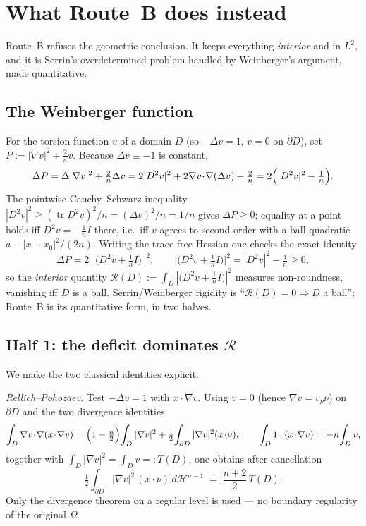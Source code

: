 \documentclass[11pt]{amsart}
\theoremstyle{definition}
\theoremstyle{remark}
\newcommand{\Om}{\Omega}
\newcommand{\R}{\mathcal R}
\newcommand{\Hn}{\mathcal H^{n-1}}
\newcommand{\TF}{\bigl(D^2v+\tfrac1n I\bigr)}
\DeclareMathOperator{\tr}{tr}
\begin{document}
\section{What Route~B does instead}

Route~B refuses the geometric conclusion. It keeps everything
\emph{interior} and in $L^2$, and it is Serrin's overdetermined problem
handled by Weinberger's argument, made quantitative.

\subsection{The Weinberger function}
For the torsion function $v$ of a domain $D$ (so $-\Delta v=1$, $v=0$
on $\partial D$), set $P:=|\nabla v|^2+\tfrac2n v$. Because
$\Delta v\equiv-1$ is constant,
\[
  \Delta P=\Delta|\nabla v|^2+\tfrac2n\Delta v
  =2|D^2v|^2+2\nabla v\!\cdot\!\nabla(\Delta v)-\tfrac2n
  =2\Bigl(|D^2v|^2-\tfrac1n\Bigr).
\]
The pointwise Cauchy--Schwarz inequality
$|D^2v|^2\ge(\tr D^2v)^2/n=(\Delta v)^2/n=1/n$ gives $\Delta P\ge0$;
equality at a point holds iff $D^2v=-\tfrac1n I$ there, i.e.\ iff $v$
agrees to second order with a ball quadratic $a-|x-x_0|^2/(2n)$.
Writing the trace-free Hessian one checks the exact identity
\begin{equation}\label{eq:DP}
  \Delta P=2\,\bigl|\,\TF\,\bigr|^2,\qquad
  \bigl|\TF\bigr|^2=|D^2v|^2-\tfrac1n\ge0,
\end{equation}
so the \emph{interior} quantity
$\R(D):=\int_D|\TF|^2$ measures non-roundness, vanishing iff $D$ is a
ball. Serrin/Weinberger rigidity is ``$\R(D)=0\Rightarrow D$ a ball'';
Route~B is its quantitative form, in two halves.

\subsection{Half 1: the deficit dominates $\R$}
We make the two classical identities explicit.

\emph{Rellich--Pohozaev.} Test $-\Delta v=1$ with $x\!\cdot\!\nabla v$.
Using $v=0$ (hence $\nabla v=v_\nu\nu$) on $\partial D$ and the two
divergence identities
\[
  \int_D\nabla v\!\cdot\!\nabla(x\!\cdot\!\nabla v)
  =\Bigl(1-\tfrac n2\Bigr)\!\int_D|\nabla v|^2
   +\tfrac12\!\int_{\partial D}|\nabla v|^2(x\!\cdot\!\nu),\qquad
  \int_D 1\cdot(x\!\cdot\!\nabla v)=-n\!\int_D v,
\]
together with $\int_D|\nabla v|^2=\int_D v=:T(D)$, one obtains after
cancellation
\begin{equation}\label{eq:poho}
  \tfrac12\int_{\partial D}|\nabla v|^2\,(x\!\cdot\!\nu)\,d\Hn
  \;=\;\frac{n+2}{2}\,T(D).
\end{equation}
Only the divergence theorem on a regular level is used --- no boundary
regularity of the original $\Om$.
\end{document}
